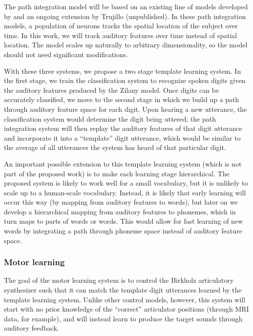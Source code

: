 \documentclass{article}
\begin{document}
The path integration model will be based
on an existing line of models
developed by \citet{XXXConklinEliasmith}
and an ongoing extension
by Trujillo (unpublished).
In these path integration models,
a population of neurons tracks
the spatial location of the subject
over time.
In this work, we will track
auditory features over time
instead of spatial location.
The \citeauthor{XXXConklinEliasmith}
model scales up naturally
to arbitrary dimensionality,
so the model should not need
significant modifications.

With these three systems,
we propose a
two stage template learning system.
In the first stage,
we train the classification system
to recognize spoken digits
given the auditory features
produced by the Zilany model.
Once digits can be accurately classified,
we move to the second stage
in which we build up a path through
auditory feature space for each digit.
Upon hearing a new utterance,
the classification system
would determine the digit being uttered;
the path integration system
will then replay the auditory features
of that digit utterance
and incorporate it into
a ``template'' digit utterance,
which would be similar to the
average of all utterances
the system has heard
of that particular digit.

An important possible extension to
this template learning system
(which is not part of the proposed work)
is to make each learning stage hierarchical.
The proposed system is likely
to work well for a small vocabulary,
but it is unlikely to scale up to
a human-scale vocabulary.
Instead, it is likely that
early learning will occur this way
(by mapping from auditory features to words),
but later on we develop a hierarchical mapping
from auditory features to phonemes,
which in turn maps to parts of words or words.
This would allow for fast learning
of new words by integrating
a path through phoneme space
instead of auditory feature space.

\subsubsection{Motor learning}
\label{subsec:motor-learning}

The goal of the motor learning system
is to control the Birkholz articulatory synthesizer
such that it can match
the template digit utterances learned
by the template learning system.
Unlike other control models, however,
this system will start with
no prior knowledge
of the ``correct'' articulator positions
(through MRI data, for example),
and will instead learn
to produce the target sounds
through auditory feedback.
\end{document}
